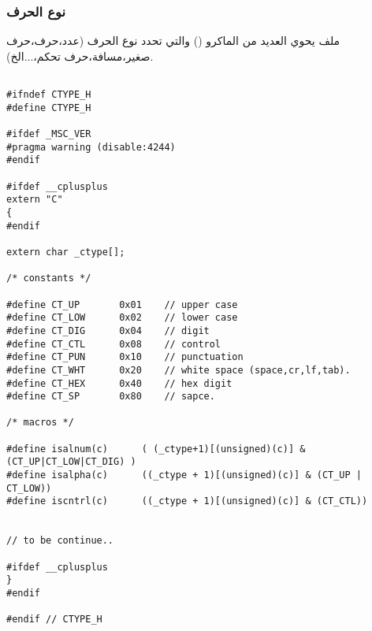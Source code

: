 \documentclass[document.tex]{subfiles}
\begin{document}
\subsubsection{نوع الحرف}
ملف  يحوي العديد من الماكرو () والتي تحدد نوع الحرف (عدد،حرف،حرف صغير،مسافة،حرف تحكم،...الخ).

\begin{english}

\lstset{numberstyle=\tiny,numbers=left,stepnumber=1,numbersep=5pt,tabsize=2,extendedchars=true,breaklines=true,frame=b,showspaces=false, showtabs=false,xleftmargin=10pt,framexleftmargin=10pt,framexrightmargin=5pt,framexbottommargin=4pt,showstringspaces=false,language=C++}

\begin{lstlisting}[label=char_type,caption=\en{ctype.h:determine character type}]

#ifndef CTYPE_H
#define CTYPE_H

#ifdef _MSC_VER
#pragma warning (disable:4244)
#endif

#ifdef __cplusplus
extern "C"
{
#endif

extern char _ctype[];

/* constants */

#define	CT_UP 		0x01	// upper case
#define CT_LOW		0x02	// lower case
#define CT_DIG		0x04	// digit
#define CT_CTL		0x08	// control
#define CT_PUN		0x10	// punctuation
#define CT_WHT		0x20	// white space (space,cr,lf,tab).
#define CT_HEX		0x40	// hex digit
#define CT_SP		0x80	// sapce.

/* macros */

#define isalnum(c)		( (_ctype+1)[(unsigned)(c)] & (CT_UP|CT_LOW|CT_DIG) )
#define isalpha(c)		((_ctype + 1)[(unsigned)(c)] & (CT_UP | CT_LOW))
#define iscntrl(c)	    ((_ctype + 1)[(unsigned)(c)] & (CT_CTL))


// to be continue..

#ifdef __cplusplus
}
#endif

#endif // CTYPE_H

\end{lstlisting}
\end{english}


\end{document}
